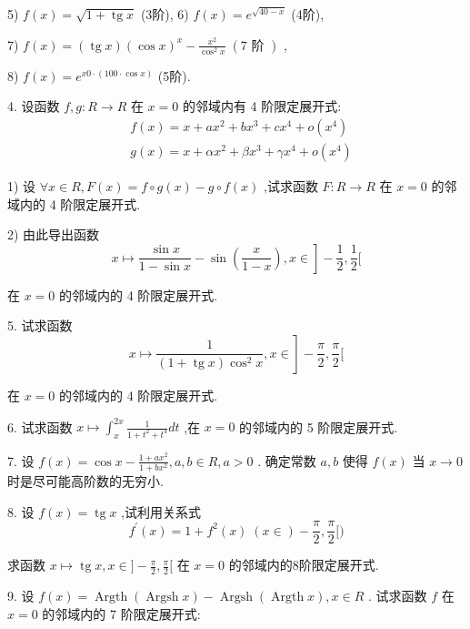 5) $f\left( x\right)  = \sqrt{1 + \operatorname{tg}x}$ (3阶), 6) $f\left( x\right)  = {e}^{\sqrt{{40} - x}}$ (4阶),

7) $f\left( x\right)  = \left( {\operatorname{tg}x}\right) {\left( \cos x\right) }^{x} - \frac{{x}^{2}}{{\cos }^{2}x}\;\left( {7\text{ 阶 }}\right)$ ,

8) $f\left( x\right)  = {e}^{{x0} \cdot  \left( {{100} \cdot  \cos x}\right) }$ (5阶).

4. 设函数 $f,g : R \rightarrow  R$ 在 $x = 0$ 的邻域内有 4 阶限定展开式:
\begin{align*}
	&f\left( x\right)  = x + a{x}^{2} + b{x}^{3} + c{x}^{4} + o\left( {x}^{4}\right)\\
	&g\left( x\right)  = x + \alpha {x}^{2} + \beta {x}^{3} + \gamma {x}^{4} + o\left( {x}^{4}\right)
\end{align*}

1) 设 $\forall x \in  R,F\left( x\right)  = f \circ  g\left( x\right)  - g \circ  f\left( x\right)$ ,试求函数 $F : R \rightarrow  R$ 在 $x = 0$ 的邻域内的 4 阶限定展开式.

2) 由此导出函数
$$\left. {x \mapsto  \frac{\sin x}{1 - \sin x} - \sin \left( \frac{x}{1 - x}\right) ,x \in  }\right\rbrack   - \frac{1}{2},\frac{1}{2}\lbrack$$

在 $x = 0$ 的邻域内的 4 阶限定展开式.

5. 试求函数
$$\left. {x \mapsto  \frac{1}{\left( {1 + \operatorname{tg}x}\right) {\cos }^{2}x},x \in  }\right\rbrack   - \frac{\pi }{2},\frac{\pi }{2}\lbrack$$

在 $x = 0$ 的邻域内的 4 阶限定展开式.

6. 试求函数 $x \mapsto  {\int }_{x}^{2x}\frac{1}{1 + {t}^{2} + {t}^{4}}{dt}$ ,在 $x = 0$ 的邻域内的 5 阶限定展开式.

7. 设 $f\left( x\right)  = \cos x - \frac{1 + a{x}^{2}}{1 + b{x}^{2}},a,b \in  R,a > 0$ . 确定常数 $a,b$ 使得 $f\left( x\right)$ 当 $x \rightarrow  0$ 时是尽可能高阶数的无穷小.

8. 设 $f\left( x\right)  = \operatorname{tg}x$ ,试利用关系式
$${f}^{\prime }\left( x\right)  = 1 + {f}^{2}\left( x\right) \;\left( {x \in  }\right)  - \frac{\pi }{2},\frac{\pi }{2}\lbrack )$$

求函数 $x \mapsto  \operatorname{tg}x,x \in  \rbrack  - \frac{\pi }{2},\frac{\pi }{2}\lbrack$ 在 $x = 0$ 的邻域内的8阶限定展开式.

9. 设 $f\left( x\right)  = \operatorname{Argth}\left( {\operatorname{Argsh}x}\right)  - \operatorname{Argsh}\left( {\operatorname{Argth}x}\right) ,x \in  R$ . 试求函数 $f$ 在 $x = 0$ 的邻域内的 7 阶限定展开式:

